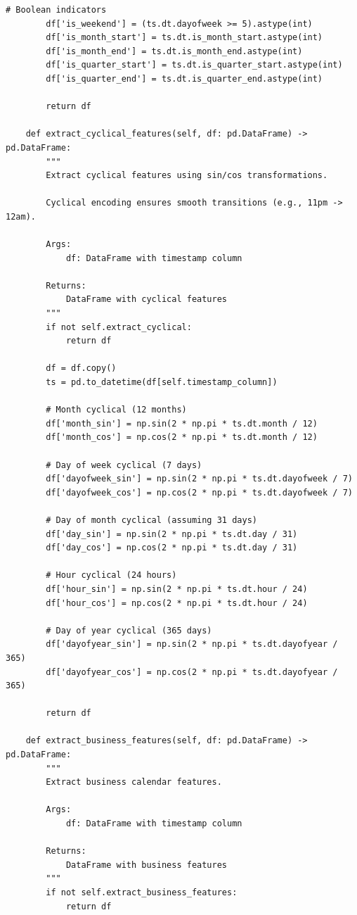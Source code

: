 \begin{lstlisting}[style=python, caption={Comprehensive Temporal Feature Engineering}]
        # Boolean indicators
        df['is_weekend'] = (ts.dt.dayofweek >= 5).astype(int)
        df['is_month_start'] = ts.dt.is_month_start.astype(int)
        df['is_month_end'] = ts.dt.is_month_end.astype(int)
        df['is_quarter_start'] = ts.dt.is_quarter_start.astype(int)
        df['is_quarter_end'] = ts.dt.is_quarter_end.astype(int)

        return df

    def extract_cyclical_features(self, df: pd.DataFrame) -> pd.DataFrame:
        """
        Extract cyclical features using sin/cos transformations.

        Cyclical encoding ensures smooth transitions (e.g., 11pm -> 12am).

        Args:
            df: DataFrame with timestamp column

        Returns:
            DataFrame with cyclical features
        """
        if not self.extract_cyclical:
            return df

        df = df.copy()
        ts = pd.to_datetime(df[self.timestamp_column])

        # Month cyclical (12 months)
        df['month_sin'] = np.sin(2 * np.pi * ts.dt.month / 12)
        df['month_cos'] = np.cos(2 * np.pi * ts.dt.month / 12)

        # Day of week cyclical (7 days)
        df['dayofweek_sin'] = np.sin(2 * np.pi * ts.dt.dayofweek / 7)
        df['dayofweek_cos'] = np.cos(2 * np.pi * ts.dt.dayofweek / 7)

        # Day of month cyclical (assuming 31 days)
        df['day_sin'] = np.sin(2 * np.pi * ts.dt.day / 31)
        df['day_cos'] = np.cos(2 * np.pi * ts.dt.day / 31)

        # Hour cyclical (24 hours)
        df['hour_sin'] = np.sin(2 * np.pi * ts.dt.hour / 24)
        df['hour_cos'] = np.cos(2 * np.pi * ts.dt.hour / 24)

        # Day of year cyclical (365 days)
        df['dayofyear_sin'] = np.sin(2 * np.pi * ts.dt.dayofyear / 365)
        df['dayofyear_cos'] = np.cos(2 * np.pi * ts.dt.dayofyear / 365)

        return df

    def extract_business_features(self, df: pd.DataFrame) -> pd.DataFrame:
        """
        Extract business calendar features.

        Args:
            df: DataFrame with timestamp column

        Returns:
            DataFrame with business features
        """
        if not self.extract_business_features:
            return df


\end{lstlisting}
